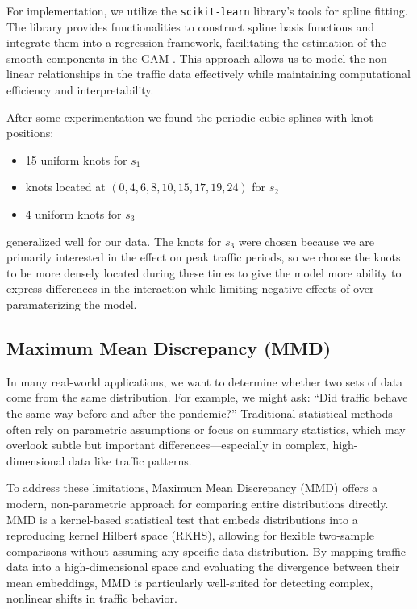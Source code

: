 \documentclass{article}
\begin{document}
For implementation, we utilize the \texttt{scikit-learn} library's tools for spline fitting. The library provides functionalities to construct spline basis functions and integrate them into a regression framework, facilitating the estimation of the smooth components in the GAM \cite{scikit-learn}. This approach allows us to model the non-linear relationships in the traffic data effectively while maintaining computational efficiency and interpretability.

After some experimentation we found the periodic cubic splines with knot positions:
\begin{itemize}
    \item 15 uniform knots for $s_1$ 
    \item knots located at $(0, 4, 6, 8, 10, 15, 17, 19, 24)$ for $s_2$
    \item 4 uniform knots for $s_3$ 
\end{itemize}
generalized well for our data. The knots for $s_3$ were chosen because we are primarily interested in the effect on peak traffic periods, so we choose the knots to be more densely located during these times to give the model more ability to express differences in the interaction while limiting negative effects of over-paramaterizing the model.

\subsection{Maximum Mean Discrepancy (MMD)}
In many real-world applications, we want to determine whether two sets of data come from the same distribution. For example, we might ask: “Did traffic behave the same way before and after the pandemic?” Traditional statistical methods often rely on parametric assumptions or focus on summary statistics, which may overlook subtle but important differences—especially in complex, high-dimensional data like traffic patterns.

	To address these limitations, Maximum Mean Discrepancy (MMD) offers a modern, non-parametric approach for comparing entire distributions directly. MMD is a kernel-based statistical test that embeds distributions into a reproducing kernel Hilbert space (RKHS), allowing for flexible two-sample comparisons without assuming any specific data distribution. By mapping traffic data into a high-dimensional space and evaluating the divergence between their mean embeddings, MMD is particularly well-suited for detecting complex, nonlinear shifts in traffic behavior.
\end{document}
